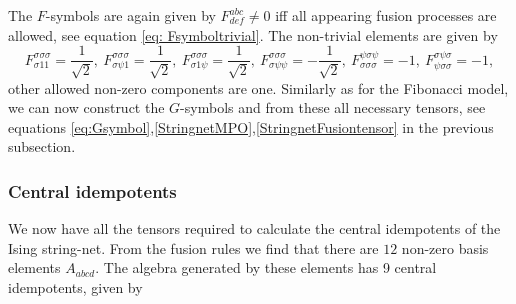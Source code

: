 \documentclass[12 pt]{article}
\begin{document}
The $F$-symbols are again given by $F^{abc}_{def}\neq 0$ iff all appearing fusion processes are allowed, see equation \eqref{eq: Fsymboltrivial}. The non-trivial elements are given by
$$
    F^{\sigma\sigma\sigma}_{\sigma 1 1}=\frac{1}{\sqrt{2}},\:
    F^{\sigma\sigma\sigma}_{\sigma \psi 1}=\frac{1}{\sqrt{2}},\:
    F^{\sigma\sigma\sigma}_{\sigma 1 \psi}=\frac{1}{\sqrt{2}},\:
    F^{\sigma\sigma\sigma}_{\sigma \psi \psi}=-\frac{1}{\sqrt{2}},\:
    F^{\psi \sigma \psi}_{\sigma \sigma \sigma}=-1, \:
    F^{\sigma \psi \sigma}_{\psi \sigma \sigma}=-1,
$$
other allowed non-zero components are one. Similarly as for the Fibonacci model, we can now construct the $G$-symbols and from these all necessary tensors, see equations \eqref{eq:Gsymbol},\eqref{StringnetMPO},\eqref{StringnetFusiontensor} in the previous subsection.
\subsubsection{Central idempotents}
We now have all the tensors required to calculate the central idempotents of the Ising string-net.
From the fusion rules we find that there are $12$ non-zero basis elements $A_{abcd}$. The algebra generated by these elements has 9 central idempotents, given by
\end{document}

